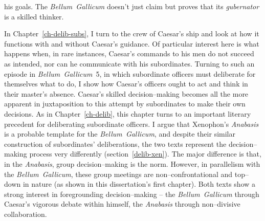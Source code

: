 \documentclass[12pt,letterpaper,oneside,final]{memoir}
\begin{document}
his goals. The \emph{Bellum~Gallicum} doesn't just claim but proves that its \emph{gubernator} is a skilled thinker.

In Chapter~\ref{ch-delib-subs}, I turn to the crew of Caesar's ship and look at how it functions with and without Caesar's guidance. Of particular interest here is what happens when, in rare instances, Caesar's commands to his men do not succeed as intended, nor can he communicate with his subordinates. Turning to such an episode in \emph{Bellum~Gallicum}~5, in which subordinate officers must deliberate for themselves what to do, I show how Caesar's officers ought to act and think in their master's absence. Caesar's skilled decision--making becomes all the more apparent in juxtaposition to this attempt by subordinates to make their own decisions. As in Chapter~\ref{ch-delib}, this chapter turns to an important literary precedent for deliberating subordinate officers. I argue that Xenophon's \emph{Anabasis} is a probable template for the \emph{Bellum~Gallicum}, and despite their similar construction of subordinates' deliberations, the two texts represent the decision--making process very differently (section~\ref{delib-xen}). The major difference is that, in the \emph{Anabasis}, group decision–making is the norm. However, in parallelism with the \emph{Bellum~Gallicum}, these group meetings are non–confrontational and top–down in nature (as shown in this dissertation's first chapter). Both texts show a strong interest in foregrounding decision--making -- the \emph{Bellum~Gallicum} through Caesar's vigorous debate within himself, the \emph{Anabasis} through non--divisive collaboration.
\end{document}
